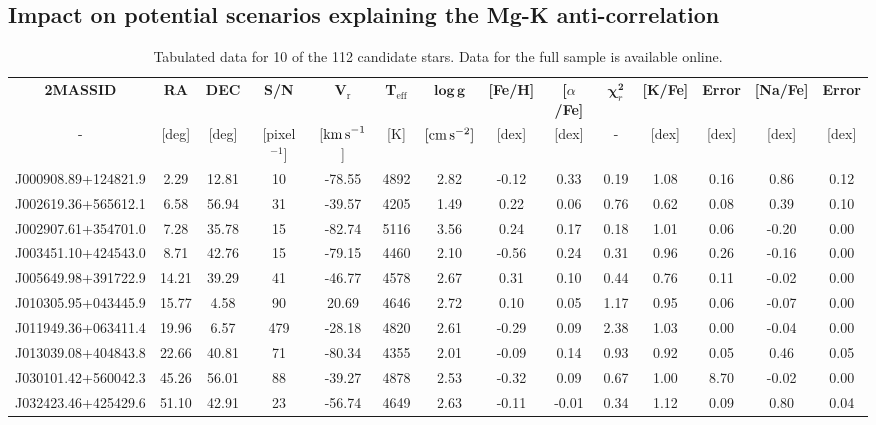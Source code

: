 \documentclass[a4paper,fleqn,usenatbib]{mnras}
\begin{document}
\subsection{Impact on potential scenarios explaining the Mg-K anti-correlation}

\label{sec:scenarios}
\begin{table}
\centering
\caption{Tabulated data for 10 of the 112 candidate stars. Data for the full sample is available online.}
\label{data}
\begin{tabular}{cccccccccccccc}
\hline
\textbf{2MASSID} & \textbf{RA} & \textbf{DEC} & \textbf{S/N} & \textbf{V$_\textrm{r}$} & \textbf{T$_\textrm{eff}$} & $\boldsymbol \log{ \, \textbf{g}}$ & \textbf{{[}Fe/H{]}} & \textbf{{[}$\alpha$/Fe{]}} & \textbf{$\boldsymbol \chi_r ^\textbf{2}$} & \textbf{{[}K/Fe{]}} & \textbf{Error} & \textbf{{[}Na/Fe{]}} & \textbf{Error} \\ 
- & {[}deg{]} & {[}deg{]} & [pixel$^{-1}]$ & {[${\rm km\,s}^{-1}$]} & {[}K{]} & $[{\rm cm\,s}^{-2}]$ & {[}dex{]} & {[}dex{]} & - & {[}dex{]} & {[}dex{]} & {[}dex{]} & {[}dex{]} \\ \hline
J000908.89+124821.9 & 2.29 & 12.81 & 10 & -78.55 & 4892 & 2.82 & -0.12 & 0.33 & 0.19 & 1.08 & 0.16 & 0.86 & 0.12 \\
J002619.36+565612.1 & 6.58 & 56.94 & 31 & -39.57 & 4205 & 1.49 & 0.22 & 0.06 & 0.76 & 0.62 & 0.08 & 0.39 & 0.10 \\
J002907.61+354701.0 & 7.28 & 35.78 & 15 & -82.74 & 5116 & 3.56 & 0.24 & 0.17 & 0.18 & 1.01 & 0.06 & -0.20 & 0.00 \\
J003451.10+424543.0 & 8.71 & 42.76 & 15 & -79.15 & 4460 & 2.10 & -0.56 & 0.24 & 0.31 & 0.96 & 0.26 & -0.16 & 0.00 \\
J005649.98+391722.9 & 14.21 & 39.29 & 41 & -46.77 & 4578 & 2.67 & 0.31 & 0.10 & 0.44 & 0.76 & 0.11 & -0.02 & 0.00 \\
J010305.95+043445.9 & 15.77 & 4.58 & 90 & 20.69 & 4646 & 2.72 & 0.10 & 0.05 & 1.17 & 0.95 & 0.06 & -0.07 & 0.00 \\
J011949.36+063411.4 & 19.96 & 6.57 & 479 & -28.18 & 4820 & 2.61 & -0.29 & 0.09 & 2.38 & 1.03 & 0.00 & -0.04 & 0.00 \\
J013039.08+404843.8 & 22.66 & 40.81 & 71 & -80.34 & 4355 & 2.01 & -0.09 & 0.14 & 0.93 & 0.92 & 0.05 & 0.46 & 0.05 \\
J030101.42+560042.3 & 45.26 & 56.01 & 88 & -39.27 & 4878 & 2.53 & -0.32 & 0.09 & 0.67 & 1.00 & 8.70 & -0.02 & 0.00 \\
J032423.46+425429.6 & 51.10 & 42.91 & 23 & -56.74 & 4649 & 2.63 & -0.11 & -0.01 & 0.34 & 1.12 & 0.09 & 0.80 & 0.04 \\ \hline
\end{tabular}
\end{table}
\end{document}
